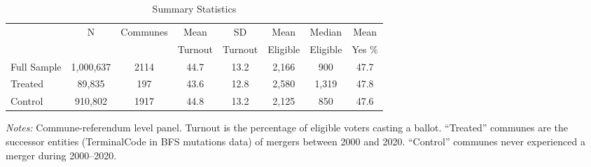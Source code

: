 \begin{table}[htbp]
\centering
\caption{Summary Statistics}
\label{tab:summary}
\begin{adjustbox}{max width=\textwidth}
\begin{tabular}{lccccccc}
\toprule
 & N & Communes & Mean & SD & Mean & Median & Mean \\
 & & & Turnout & Turnout & Eligible & Eligible & Yes \% \\
\midrule
Full Sample & 1,000,637 & 2114 & 44.7 & 13.2 & 2,166 & 900 & 47.7 \\
Treated & 89,835 & 197 & 43.6 & 12.8 & 2,580 & 1,319 & 47.8 \\
Control & 910,802 & 1917 & 44.8 & 13.2 & 2,125 & 850 & 47.6 \\
\bottomrule
\end{tabular}
\end{adjustbox}
\begin{minipage}{0.9\textwidth}
\footnotesize
\emph{Notes:} Commune-referendum level panel. Turnout is the percentage of eligible voters casting a ballot. ``Treated'' communes are the successor entities (TerminalCode in BFS mutations data) of mergers between 2000 and 2020. ``Control'' communes never experienced a merger during 2000--2020.
\end{minipage}
\end{table}
